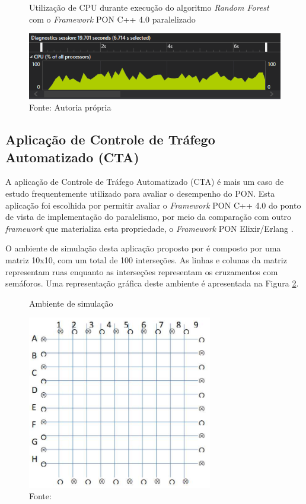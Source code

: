 \begin{figure}[!htb]
\centering
\caption{Utilização de CPU durante execução do algoritmo \textit{Random Forest}
com o \textit{Framework} PON C++ 4.0 paralelizado}
\includegraphics[width=\textwidth]{../figures/cpu_rf_par.png}
\smallskip
\caption*{Fonte: Autoria própria}
\label{fig:rf_cpu_par}
\end{figure}


\subsection{Aplicação de Controle de Tráfego Automatizado (CTA)}\label{sec:semaforo}

A aplicação de Controle de Tráfego Automatizado (CTA) é mais um caso de estudo frequentemente
utilizado para avaliar o desempenho do PON. Esta aplicação foi escolhida por
permitir avaliar o \textit{Framework} PON C++ 4.0  do ponto de vista de
implementação do paralelismo, por meio da comparação com outro
\textit{framework} que materializa esta propriedade, o \textit{Framework} PON
Elixir/Erlang \cite{msc_negrini_2019}.

O ambiente de simulação desta aplicação proposto por  é
composto por uma matriz 10x10, com um total de 100 interseções. As linhas e
colunas da matriz representam ruas enquanto as interseções representam os
cruzamentos com semáforos. Uma representação gráfica deste ambiente é
apresentada na Figura \ref{fig:cta_renaux}.

\begin{figure}[!htb]
\centering
\caption{Ambiente de simulação}
\includegraphics[width=0.72\textwidth]{../figures/semaforos_renaux.png}
\smallskip
\caption*{Fonte: }
\label{fig:cta_renaux}
\end{figure}

